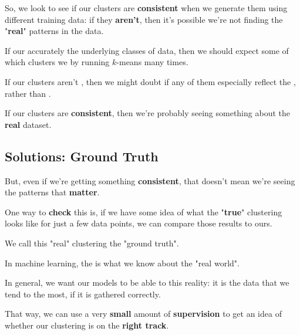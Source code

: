         So, we look to see if our clusters are \textbf{consistent} when we generate them using different training data: 
        if they \textbf{aren't}, then it's possible we're not finding the "\textbf{real}" patterns in the data.\\
        
        \begin{concept}
            If our  accurately  the underlying classes of data, then we should expect some  of which clusters we  by running $k$-means many times.
            
            If our clusters aren't , then we might doubt if any of them especially reflect the , rather than .
        \end{concept}

        If our clusters are \textbf{consistent}, then we're probably seeing something about the \textbf{real} dataset.
    
    \subsection{Solutions: Ground Truth}
    
        But, even if we're getting something \textbf{consistent}, that doesn't mean we're seeing the patterns that \textbf{matter}. 
        
        One way to \textbf{check} this is, if we have some idea of what the "\textbf{true}" clustering looks like for just a few data points, we can compare those results to ours.
        
        We call this "real" clustering the "ground truth".\\
        
        \begin{definition}
            In machine learning, the  is what we know about the "real world".
            
            In general, we want our models to be able to  this reality: it is the data that we tend to  the most, if it is gathered correctly.
        \end{definition}
        
        That way, we can use a very \textbf{small} amount of \textbf{supervision} to get an idea of whether our clustering is on the \textbf{right track}.
    
